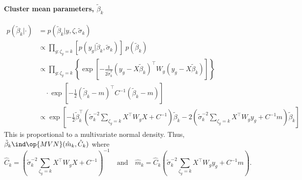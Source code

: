 \paragraph{Cluster mean parameters, $\tilde{\beta}_k$}
\begin{align*}
p(\tilde{\beta}_k|\cdot) & = p(\tilde{\beta}_k|y, \zeta, \tilde{\sigma}_k)\\
                         & \propto \prod_{g:\zeta_g=k} \left[p(y_g|\tilde{\beta}_k, \tilde{\sigma}_k)\right]\; p(\tilde{\beta}_k)\\
                         & \propto \prod_{g:\zeta_g=k}  \left\{ \exp \left[ -\frac{1}{2\tilde{\sigma}^2_k} \left( y_g - X\tilde{\beta}_k \right)^\top W_g \left( y_g - X\tilde{\beta}_k \right) \right]\right\}\\
                         & \quad \cdot \exp \left[ -\frac{1}{2}\left(\tilde{\beta}_k-m\right)^\top C^{-1} \left( \tilde{\beta}_k-m\right)\right]\\
                         & \propto \exp \left[ -\frac{1}{2} \tilde{\beta}_k^\top \left( \tilde{\sigma}^{-2}_k \sum_{\zeta_g=k} X^\top W_g X + C^{-1} \right) \tilde{\beta}_k - 2 \left( \tilde{\sigma}_k^{-2} \sum_{\zeta_g=k} X^\top W_g y_g + C^{-1} m \right)\tilde{\beta}_k \right]
\end{align*}
This is proportional to a multivariate normal density.
Thus, $\tilde{\beta}_k \ind \op{MVN}(\hat{m}_k,\hat{C}_k)$ where
\begin{equation*}
\hat{C}_k = \left( \tilde{\sigma}^{-2}_k \sum_{\zeta_g=k} X^\top W_g X + C^{-1} \right)^{-1} \quad %
\mbox{and} \quad \hat{m}_k = \hat{C}_k  \left( \tilde{\sigma}_k^{-2} \sum_{\zeta_g=k} X^\top W_g y_g + C^{-1} m \right).
\end{equation*}

